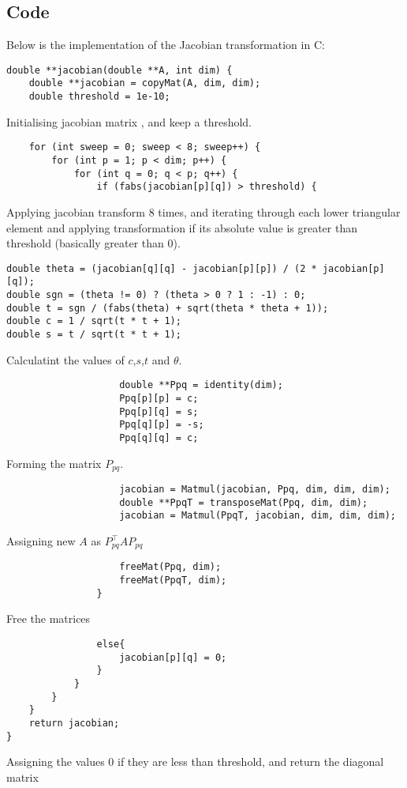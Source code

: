 \documentclass[a4paper,12pt]{article}
\theoremstyle{remark}
\begin{document}
\subsection{Code}
Below is the implementation of the Jacobian transformation in C:
\begin{verbatim}
double **jacobian(double **A, int dim) {
    double **jacobian = copyMat(A, dim, dim);
    double threshold = 1e-10;
\end{verbatim}
Initialising jacobian matrix , and keep a threshold.
\begin{verbatim}
    for (int sweep = 0; sweep < 8; sweep++) {
        for (int p = 1; p < dim; p++) {
            for (int q = 0; q < p; q++) {
                if (fabs(jacobian[p][q]) > threshold) {
\end{verbatim}
Applying jacobian transform 8 times, and iterating through each lower triangular element and applying transformation if its absolute value is greater than threshold (basically greater than 0).
\begin{verbatim}
double theta = (jacobian[q][q] - jacobian[p][p]) / (2 * jacobian[p][q]);
double sgn = (theta != 0) ? (theta > 0 ? 1 : -1) : 0;
double t = sgn / (fabs(theta) + sqrt(theta * theta + 1));
double c = 1 / sqrt(t * t + 1);
double s = t / sqrt(t * t + 1);
\end{verbatim}
Calculatint the values of $c$,$s$,$t$ and $\theta$.
\begin{verbatim}
                    double **Ppq = identity(dim);
                    Ppq[p][p] = c;
                    Ppq[p][q] = s;
                    Ppq[q][p] = -s;
                    Ppq[q][q] = c;

\end{verbatim}
Forming the matrix $P_{pq}$.
\begin{verbatim}
                    jacobian = Matmul(jacobian, Ppq, dim, dim, dim);
                    double **PpqT = transposeMat(Ppq, dim, dim);
                    jacobian = Matmul(PpqT, jacobian, dim, dim, dim);
\end{verbatim}
Assigning new $A$ as $P_{pq}^\top A P_{pq}$ 
\begin{verbatim}
                    freeMat(Ppq, dim);
                    freeMat(PpqT, dim);
                }
\end{verbatim}
Free the matrices
\begin{verbatim}
                else{
                	jacobian[p][q] = 0;
                }
            }
        }
    }
    return jacobian;
}
\end{verbatim}
Assigning the values 0 if they are less than threshold, and return the diagonal matrix
\end{document}
